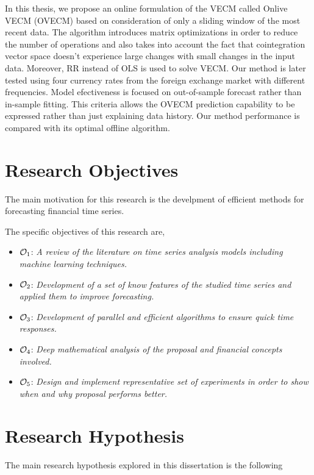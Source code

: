 In this thesis, we propose an online formulation of the VECM called Onlive VECM
(OVECM) based on consideration of only a sliding window of the most recent data.
The algorithm introduces matrix optimizations in order to reduce the number of
operations and also takes into account the fact that cointegration vector space
doesn't experience large changes with small changes in the input data. Moreover,
RR instead of OLS is used to solve VECM. Our method is later tested using four
currency rates from the foreign exchange market with different frequencies.  Model
efectiveness is focused on out-of-sample forecast rather than in-sample fitting.
This criteria allows the OVECM prediction capability to be expressed rather than
just explaining data history. Our method performance is compared with its
optimal offline algorithm.


\section{Research Objectives}
The main motivation for this research is the develpment of efficient methods for
forecasting financial time series.

The specific objectives of this research are,
\begin{itemize}
\item $\Large \mathcal{O}_1$: \emph{A review of the literature on time series
analysis models including machine learning techniques.}
\item $\Large \mathcal{O}_2$: \emph{Development of a set of know features of the
studied time series and applied them to improve forecasting.}
\item $\Large \mathcal{O}_3$: \emph{Development of parallel and efficient
algorithms to ensure quick time responses.}
\item $\Large \mathcal{O}_4$: \emph{Deep mathematical analysis of the proposal
and financial concepts involved.}
\item $\Large \mathcal{O}_5$: \emph{Design and implement representative set of
experiments in order to show when and why proposal performs better.}
\end{itemize}


\section{Research Hypothesis}


The main research hypothesis explored in this dissertation is the following \\

